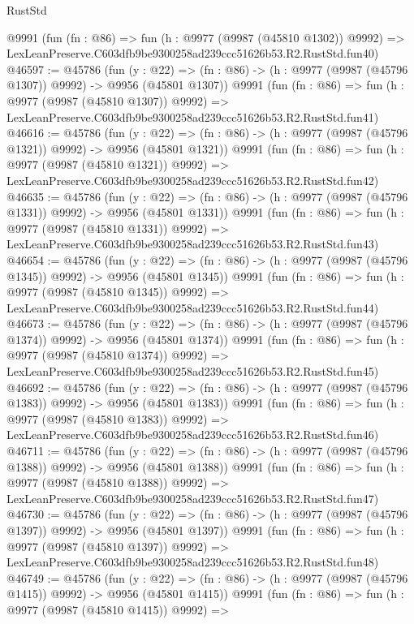 \begin{lexlean}{RustStd}
\begin{coremodule}
    @9991
    (fun (fn : @86) =>
    fun (h : @9977 (@9987 (@45810 @1302)) @9992) =>
    LexLeanPreserve.C603dfb9be9300258ad239ccc51626b53.R2.RustStd.fun40)
@46597 := @45786
    (fun (y : @22) =>
    (fn : @86) -> (h : @9977 (@9987 (@45796 @1307)) @9992) -> @9956 (@45801 @1307))
    @9991
    (fun (fn : @86) =>
    fun (h : @9977 (@9987 (@45810 @1307)) @9992) =>
    LexLeanPreserve.C603dfb9be9300258ad239ccc51626b53.R2.RustStd.fun41)
@46616 := @45786
    (fun (y : @22) =>
    (fn : @86) -> (h : @9977 (@9987 (@45796 @1321)) @9992) -> @9956 (@45801 @1321))
    @9991
    (fun (fn : @86) =>
    fun (h : @9977 (@9987 (@45810 @1321)) @9992) =>
    LexLeanPreserve.C603dfb9be9300258ad239ccc51626b53.R2.RustStd.fun42)
@46635 := @45786
    (fun (y : @22) =>
    (fn : @86) -> (h : @9977 (@9987 (@45796 @1331)) @9992) -> @9956 (@45801 @1331))
    @9991
    (fun (fn : @86) =>
    fun (h : @9977 (@9987 (@45810 @1331)) @9992) =>
    LexLeanPreserve.C603dfb9be9300258ad239ccc51626b53.R2.RustStd.fun43)
@46654 := @45786
    (fun (y : @22) =>
    (fn : @86) -> (h : @9977 (@9987 (@45796 @1345)) @9992) -> @9956 (@45801 @1345))
    @9991
    (fun (fn : @86) =>
    fun (h : @9977 (@9987 (@45810 @1345)) @9992) =>
    LexLeanPreserve.C603dfb9be9300258ad239ccc51626b53.R2.RustStd.fun44)
@46673 := @45786
    (fun (y : @22) =>
    (fn : @86) -> (h : @9977 (@9987 (@45796 @1374)) @9992) -> @9956 (@45801 @1374))
    @9991
    (fun (fn : @86) =>
    fun (h : @9977 (@9987 (@45810 @1374)) @9992) =>
    LexLeanPreserve.C603dfb9be9300258ad239ccc51626b53.R2.RustStd.fun45)
@46692 := @45786
    (fun (y : @22) =>
    (fn : @86) -> (h : @9977 (@9987 (@45796 @1383)) @9992) -> @9956 (@45801 @1383))
    @9991
    (fun (fn : @86) =>
    fun (h : @9977 (@9987 (@45810 @1383)) @9992) =>
    LexLeanPreserve.C603dfb9be9300258ad239ccc51626b53.R2.RustStd.fun46)
@46711 := @45786
    (fun (y : @22) =>
    (fn : @86) -> (h : @9977 (@9987 (@45796 @1388)) @9992) -> @9956 (@45801 @1388))
    @9991
    (fun (fn : @86) =>
    fun (h : @9977 (@9987 (@45810 @1388)) @9992) =>
    LexLeanPreserve.C603dfb9be9300258ad239ccc51626b53.R2.RustStd.fun47)
@46730 := @45786
    (fun (y : @22) =>
    (fn : @86) -> (h : @9977 (@9987 (@45796 @1397)) @9992) -> @9956 (@45801 @1397))
    @9991
    (fun (fn : @86) =>
    fun (h : @9977 (@9987 (@45810 @1397)) @9992) =>
    LexLeanPreserve.C603dfb9be9300258ad239ccc51626b53.R2.RustStd.fun48)
@46749 := @45786
    (fun (y : @22) =>
    (fn : @86) -> (h : @9977 (@9987 (@45796 @1415)) @9992) -> @9956 (@45801 @1415))
    @9991
    (fun (fn : @86) =>
    fun (h : @9977 (@9987 (@45810 @1415)) @9992) =>

\end{coremodule}
\end{lexlean}
